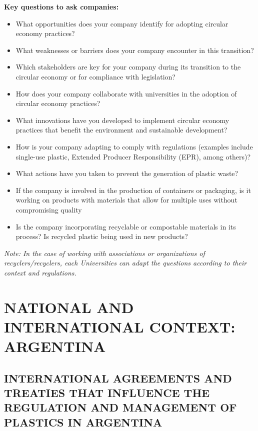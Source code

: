 \documentclass[
  12pt,
  oneside]{book}
\providecommand{\tightlist}{%
  \setlength{\itemsep}{0pt}\setlength{\parskip}{0pt}}
\begin{document}
\textbf{Key questions to ask companies:}

\begin{itemize}
\tightlist
\item
  What opportunities does your company identify for adopting circular
  economy practices?
\item
  What weaknesses or barriers does your company encounter in this
  transition?
\item
  Which stakeholders are key for your company during its transition to
  the circular economy or for compliance with legislation?
\item
  How does your company collaborate with universities in the adoption of
  circular economy practices?
\item
  What innovations have you developed to implement circular economy
  practices that benefit the environment and sustainable development?
\item
  How is your company adapting to comply with regulations (examples
  include single-use plastic, Extended Producer Responsibility (EPR),
  among others)?
\item
  What actions have you taken to prevent the generation of plastic
  waste?
\item
  If the company is involved in the production of containers or
  packaging, is it working on products with materials that allow for
  multiple uses without compromising quality
\item
  Is the company incorporating recyclable or compostable materials in
  its process? Is recycled plastic being used in new products?
\end{itemize}

\emph{Note: In the case of working with associations or organizations of
recyclers/recyclers, each Universities can adapt the questions according
to their context and regulations.}

\chapter{NATIONAL AND INTERNATIONAL CONTEXT:
ARGENTINA}\label{sec-argentina}

\section{INTERNATIONAL AGREEMENTS AND TREATIES THAT INFLUENCE THE
REGULATION AND MANAGEMENT OF PLASTICS IN
ARGENTINA}\label{international-agreements-and-treaties-that-influence-the-regulation-and-management-of-plastics-in-argentina}
\end{document}
